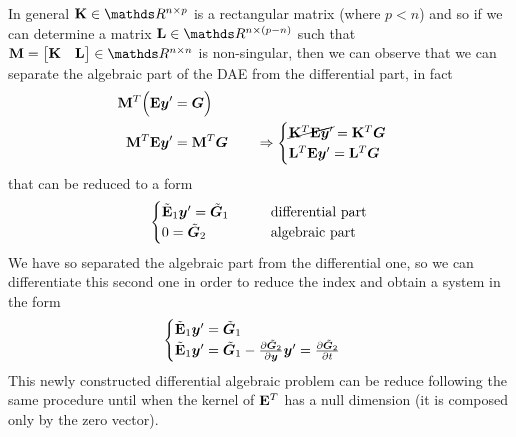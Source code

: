 	In general $\mat K \in \mathds R^{n\times p}$ is a rectangular matrix (where $p < n$) and so if we can determine a matrix $\mat L \in \mathds R^{n\times (p-n)}$ such that $\mat M = \matrix{\mat K & \mat L} \in \mathds R^{n\times n}$ is non-singular, then we can observe that we can separate the algebraic part of the DAE from the differential part, in fact
	\begin{align*}
		\mathbf{M}^T\Big(  \mathbf{E} \boldsymbol{y}' & = \boldsymbol{G} \Big) \\
		\mathbf{M}^T \mathbf{E} \boldsymbol{y}' & = \mathbf{M}^T \boldsymbol{G} \qquad \Rightarrow \begin{cases}
			\cancel{\mathbf{K}^T \mathbf{E} \boldsymbol{y}'} = \mathbf{K}^T \boldsymbol{G} \\ \mathbf{L}^T \mathbf{E} \boldsymbol{y}' = \mathbf{L}^T \boldsymbol{G}
		\end{cases}
	\end{align*}
	that can be reduced to a form
	\begin{equation}
	\begin{cases}
		\tilde{\mathbf{E}}_1 \boldsymbol{y}' = \tilde{\boldsymbol{G}}_1  \qquad & \textrm{differential part}\\ 0 = \tilde{\boldsymbol{G}}_2 & \textrm{algebraic part}
	\end{cases}
	\end{equation}
	We have so separated the algebraic part from the differential one, so we can differentiate this second one in order to reduce the index and obtain a system in the form
	\[ \begin{cases}
		\tilde{\mathbf{E}}_1 \boldsymbol{y}' = \tilde{\boldsymbol{G}}_1 \\
		\tilde{\mathbf{E}}_1 \boldsymbol{y}' = \tilde{\boldsymbol{G}}_1  
		-\frac{\partial \tilde{\boldsymbol{G}}_2}{\partial \boldsymbol{y}} \boldsymbol{y}' = \frac{\partial \tilde{\boldsymbol{G}}_2}{\partial t} 
	\end{cases} \]
	This newly constructed differential algebraic problem can be reduce following the same procedure until when the kernel of $\mathbf{E}^T$ has a null dimension (it is composed only by the zero vector).
	
